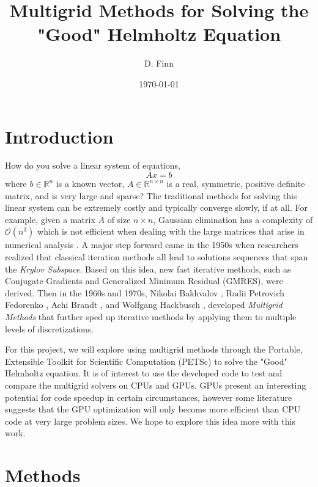\documentclass[]{article}
\theoremstyle{definition}
\begin{document}
\title{Multigrid Methods for Solving the "Good" Helmholtz Equation}
\author{D. Finn} 
\date{\today}

\maketitle


\section{Introduction}

How do you solve a linear system of equations,
\begin{equation}
A x = b
\end{equation}
where $b \in \mathbb{R}^n$ is a known vector, $A \in \mathbb{R}^{n \times n}$ is a real, symmetric, positive definite matrix,  and is very large and sparse?  The traditional methods for solving this linear system can be extremely costly and typically converge slowly, if at all.  For example, given a matrix $A$ of size $n \times n$, Gaussian elimination has a complexity of $\mathcal{O} (n^3)$ which is not efficient when dealing with the large matrices that arise in numerical analysis \cite{Ispen1997}.  A major step forward came in the 1950s when researchers realized that classical iteration methods all lead to solutions sequences that span the \textit{Krylov Subspace}.  Based on this idea, new fast iterative methods, such as Conjugate Gradients and Generalized Minimum Residual (GMRES), were derived.  Then in the 1960s and 1970s, Nikolai Bakhvalov \cite{Bakhvalov1966}, Radii Petrovich Fedorenko \cite{Fedorenko1962, Fedorenko1964}, Achi Brandt \cite{Achi1973, Achi1977}, and Wolfgang Hackbusch \cite{Hackbusch1977}, developed \textit{Multigrid Methods} that further sped up iterative methods by applying them to multiple levels of discretizations.  

For this project, we will explore using multigrid methods through the Portable, Extensible Toolkit for Scientific Computation (PETSc) to solve the "Good" Helmholtz equation.  It is of interest to use the developed code to test and compare the multigrid solvers on CPUs and GPUs.  GPUs present an interesting potential for code speedup in certain circumstances, however some literature \cite{May2016} suggests that the GPU optimization will only become more efficient than CPU code at very large problem sizes.   We hope to explore this idea more with this work.

\section{Methods}
\end{document}
